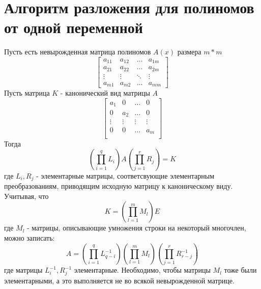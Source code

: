 \documentclass[14pt, a4paper]{extreport}
\begin{document}
	\section{Алгоритм разложения для полиномов от одной переменной}
	Пусть есть невырожденная матрица полиномов $A(x)$ размера $m*m$
	\[
		\begin{bmatrix}
			a_{11} & a_{12} & \dots & a_{1m} \\
			a_{21} & a_{22} & \dots & a_{2m} \\
			\vdots & \vdots & \ddots & \vdots \\
			a_{m1} & a_{m2} & \dots & a_{mm}
		\end{bmatrix}
	\]
	Пусть матрица $K$ - канонический вид матрицы $A$
	\[
		\begin{bmatrix}
			a_{1} & 0 & \dots & 0 \\
			0 & a_{2} & \dots & 0 \\
			\vdots & \vdots & \vdots & \vdots \\
			0 & 0 & \dots & a_{m} \\
		\end{bmatrix}
	\]
	Тогда
	\begin{equation*}
		(\prod\limits_{i=1}^{q}L_{i})A(\prod\limits_{j=1}^{r}R_{j}) = K
	\end{equation*}
	где $L_{i},R_{j}$ - элементарные матрицы, соответсвующие элементарным преобразованиям,
	приводящим исходную матрицу к каноническому виду.\\
	Учитывая, что
	\begin{equation*}
		K = (\prod\limits_{l=1}^{m}M_{l})E
	\end{equation*}
	где $M_{l}$ - матрицы, описывающие умножения строки на некоторый многочлен, можно записать:
	\begin{equation*}
		\label{final:form}
		A =
		(\prod\limits_{i=1}^{q}L_{q-i}^{-1})
		(\prod\limits_{l=1}^{m}M_{l})
		(\prod\limits_{j=1}^{r}R_{r-j}^{-1})
	\end{equation*}
	где матрицы $L_{i}^{-1},R_{j}^{-1}$ элементарные. Необходимо, чтобы матрицы $M_{l}$ тоже были
	элементарными, а это выполняется не во всякой невырожденной матрице.
	\newpage
\end{document}
